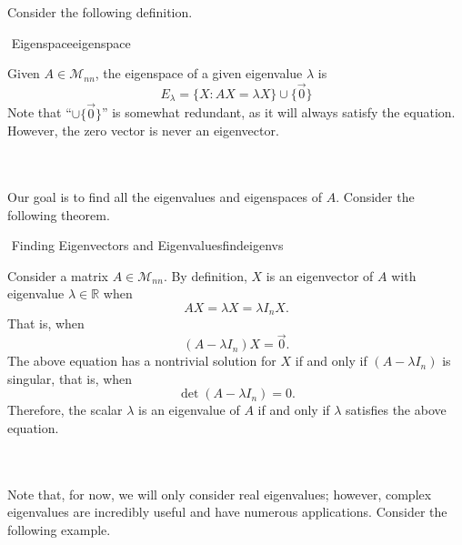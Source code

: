         Consider the following definition.
        \begin{definition}{\Stop\,\,Eigenspace}{eigenspace}

            Given \(A\in\mathcal{M}_{nn}\), the eigenspace of a given eigenvalue \(\lambda\) is
            \begin{equation*}
                E_\lambda=\{X:AX=\lambda X\}\cup\{\vec{0}\}
            \end{equation*}
            Note that ``\(\cup \{\vec{0}\}\)'' is somewhat redundant, as it will always satisfy the equation. However, the zero vector is never an eigenvector.

        \end{definition}
        \vphantom
        \\
        \\
        Our goal is to find all the eigenvalues and eigenspaces of \(A\). Consider the following theorem.
        \begin{theorem}{\Stop\,\,Finding Eigenvectors and Eigenvalues}{findeigenvs}
    
            Consider a matrix \(A\in\mathcal{M}_{nn}\). By definition, \(X\) is an eigenvector of \(A\) with eigenvalue \(\lambda\in\mathbb{R}\) when
            \begin{equation*}
                AX=\lambda X=\lambda I_nX.
            \end{equation*}
            That is, when
            \begin{equation*}
                (A-\lambda I_n)X=\vec{0}.
            \end{equation*}
            The above equation has a nontrivial solution for \(X\) if and only if \((A-\lambda I_n)\) is singular, that is, when
            \begin{equation*}
                \det(A-\lambda I_n)=0.
            \end{equation*}
            Therefore, the scalar \(\lambda\) is an eigenvalue of \(A\) if and only if \(\lambda\) satisfies the above equation.
        \end{theorem}
        \pagebreak
        \vphantom
        \\
        \\
        Note that, for now, we will only consider real eigenvalues; however, complex eigenvalues are incredibly useful and have numerous applications. Consider the following example.
